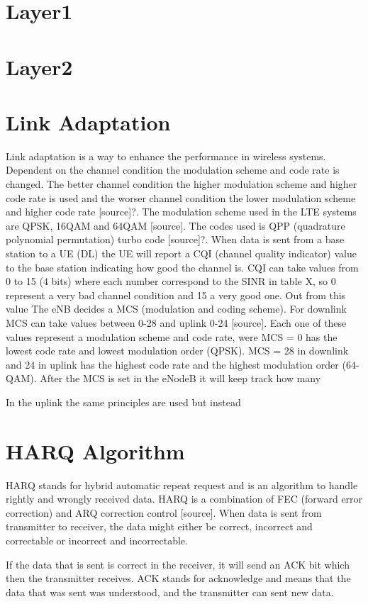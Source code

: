 \documentclass[cropmarks, frame, english]{idamasterthesis}
\begin{document}
\section{Layer1}
\section{Layer2}
\section{Link Adaptation}
Link adaptation is a way to enhance the performance in wireless systems. Dependent on the channel condition the modulation scheme and code rate is changed. The better channel condition the higher modulation scheme and higher code rate is used and the worser channel condition the lower modulation scheme and higher code rate [source]?. The modulation scheme used in the LTE systems are QPSK, 16QAM and 64QAM [source]. The codes used is QPP (quadrature polynomial permutation) turbo code [source]?. When data is sent from a base station to a UE (DL) the UE will report a CQI (channel quality indicator) value to the base station indicating how good the channel is. CQI can take values from 0 to 15 (4 bits) where each number correspond to the SINR in table X, so 0 represent a very bad channel condition and 15 a very good one. Out from this value The eNB decides a MCS (modulation and coding scheme). For downlink MCS can take values between 0-28 and uplink 0-24 [source]. Each one of these values represent a modulation scheme and code rate, were MCS = 0 has the lowest code rate and lowest modulation order (QPSK). MCS = 28 in downlink and 24 in uplink has the highest code rate and the highest modulation order (64-QAM). After the MCS is set in the eNodeB it will keep track how many

In the uplink the same principles are used but instead


\section{HARQ Algorithm}
HARQ stands for hybrid automatic repeat request and is an algorithm to handle rightly and wrongly received data. HARQ is a combination of FEC (forward error correction) and ARQ correction control [source]. When data is sent from transmitter to receiver, the data might either be correct, incorrect and correctable or incorrect and incorrectable.

If the data that is sent is correct in the receiver, it will send an ACK bit which then the transmitter receives. ACK stands for acknowledge and means that the data that was sent was understood, and the transmitter can sent new data.
\end{document}
